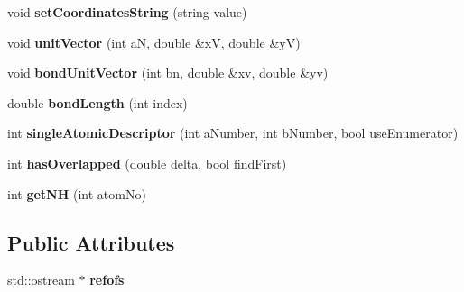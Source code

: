 \begin{DoxyCompactItemize}
\item 
\hypertarget{class_open_babel_1_1_t_simple_molecule_a91b7eca7676e8e850ccfd1e87f7c57b7}{void {\bfseries set\-Coordinates\-String} (string value)}\label{class_open_babel_1_1_t_simple_molecule_a91b7eca7676e8e850ccfd1e87f7c57b7}

\item 
\hypertarget{class_open_babel_1_1_t_simple_molecule_ace8eaaeb0ae8755cfdeb5a7660ceb929}{void {\bfseries unit\-Vector} (int a\-N, double \&x\-V, double \&y\-V)}\label{class_open_babel_1_1_t_simple_molecule_ace8eaaeb0ae8755cfdeb5a7660ceb929}

\item 
\hypertarget{class_open_babel_1_1_t_simple_molecule_a602a2bea654031ade3ed3d229dba25eb}{void {\bfseries bond\-Unit\-Vector} (int bn, double \&xv, double \&yv)}\label{class_open_babel_1_1_t_simple_molecule_a602a2bea654031ade3ed3d229dba25eb}

\item 
\hypertarget{class_open_babel_1_1_t_simple_molecule_a5daba2e548ba866d15eea8ef5cd715ae}{double {\bfseries bond\-Length} (int index)}\label{class_open_babel_1_1_t_simple_molecule_a5daba2e548ba866d15eea8ef5cd715ae}

\item 
\hypertarget{class_open_babel_1_1_t_simple_molecule_adaaa3c17213e17f8a62028ac5b1d17ba}{int {\bfseries single\-Atomic\-Descriptor} (int a\-Number, int b\-Number, bool use\-Enumerator)}\label{class_open_babel_1_1_t_simple_molecule_adaaa3c17213e17f8a62028ac5b1d17ba}

\item 
\hypertarget{class_open_babel_1_1_t_simple_molecule_a481ea7e2e96ed4b028d13621fc5d7df2}{int {\bfseries has\-Overlapped} (double delta, bool find\-First)}\label{class_open_babel_1_1_t_simple_molecule_a481ea7e2e96ed4b028d13621fc5d7df2}

\item 
\hypertarget{class_open_babel_1_1_t_simple_molecule_a93e9fac6f0f7ad29ed4c79a38cbc7bef}{int {\bfseries get\-N\-H} (int atom\-No)}\label{class_open_babel_1_1_t_simple_molecule_a93e9fac6f0f7ad29ed4c79a38cbc7bef}

\end{DoxyCompactItemize}
\subsection*{Public Attributes}
\begin{DoxyCompactItemize}
\item 
\hypertarget{class_open_babel_1_1_t_simple_molecule_a2bb7c9cf93ad411ec221cadfefe66139}{std\-::ostream $\ast$ {\bfseries refofs}}\label{class_open_babel_1_1_t_simple_molecule_a2bb7c9cf93ad411ec221cadfefe66139}

\end{DoxyCompactItemize}
